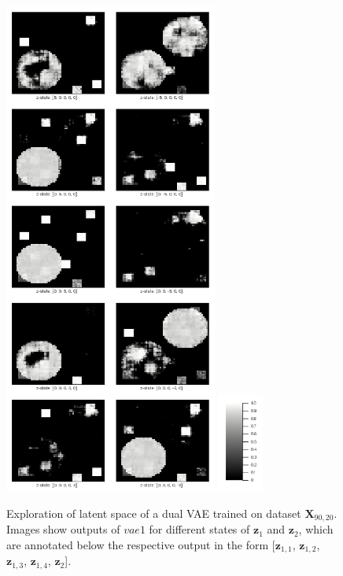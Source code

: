 \documentclass[12pt]{report}
\theoremstyle{definition}
\begin{document}
\begin{figure}
\begin{center}
  \includegraphics[width=7cm]{../code/plots/exploration3.png}
  \includegraphics[width=1.5cm]{../code/plots/scale.png}
  \caption{Exploration of latent space of a dual VAE trained on dataset $\mathbf{X}_{90, 20}$. Images show outputs of $vae1$ for different states of $\mathbf{z}_1$ and $\mathbf{z}_2$, which are annotated below the respective output in the form [$\mathbf{z}_{1, 1}$, $\mathbf{z}_{1, 2}$, $\mathbf{z}_{1, 3}$, $\mathbf{z}_{1, 4}$, $\mathbf{z}_2$].}
  \label{fig:expl3}
\end{center}
\end{figure}
\end{document}
